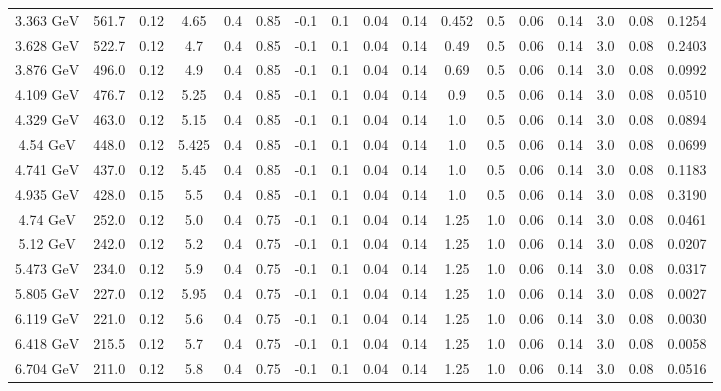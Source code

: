 \documentclass[11pt]{article}
\begin{document}
\begin{table}[htbp]
{\begin{tabular}{ccccccccccccccccc}
				3.363 ${\textrm{GeV}}$ & 561.7 & 0.12 & 4.65 & 0.4 & 0.85 & -0.1 & 0.1 & 0.04 & 0.14 & 0.452 & 0.5 & 0.06 & 0.14 & 3.0 & 0.08 & 0.1254 \\
				3.628 ${\textrm{GeV}}$ & 522.7 & 0.12 & 4.7 & 0.4 & 0.85 & -0.1 & 0.1 & 0.04 & 0.14 & 0.49 & 0.5 & 0.06 & 0.14 & 3.0 & 0.08 & 0.2403 \\
				3.876 ${\textrm{GeV}}$ & 496.0 & 0.12 & 4.9 & 0.4 & 0.85 & -0.1 & 0.1 & 0.04 & 0.14 & 0.69 & 0.5 & 0.06 & 0.14 & 3.0 & 0.08 & 0.0992 \\
				4.109 ${\textrm{GeV}}$ & 476.7 & 0.12 & 5.25 & 0.4 & 0.85 & -0.1 & 0.1 & 0.04 & 0.14 & 0.9 & 0.5 & 0.06 & 0.14 & 3.0 & 0.08 & 0.0510 \\
				4.329 ${\textrm{GeV}}$ & 463.0 & 0.12 & 5.15 & 0.4 & 0.85 & -0.1 & 0.1 & 0.04 & 0.14 & 1.0 & 0.5 & 0.06 & 0.14 & 3.0 & 0.08 & 0.0894 \\
				4.54 ${\textrm{GeV}}$ & 448.0 & 0.12 & 5.425 & 0.4 & 0.85 & -0.1 & 0.1 & 0.04 & 0.14 & 1.0 & 0.5 & 0.06 & 0.14 & 3.0 & 0.08 & 0.0699 \\
				4.741 ${\textrm{GeV}}$ & 437.0 & 0.12 & 5.45 & 0.4 & 0.85 & -0.1 & 0.1 & 0.04 & 0.14 & 1.0 & 0.5 & 0.06 & 0.14 & 3.0 & 0.08 & 0.1183 \\
				4.935 ${\textrm{GeV}}$ & 428.0 & 0.15 & 5.5 & 0.4 & 0.85 & -0.1 & 0.1 & 0.04 & 0.14 & 1.0 & 0.5 & 0.06 & 0.14 & 3.0 & 0.08 & 0.3190 \\
				\midrule
				4.74 ${\textrm{GeV}}$ & 252.0 & 0.12 & 5.0 & 0.4 & 0.75 & -0.1 & 0.1 & 0.04 & 0.14 & 1.25 & 1.0 & 0.06 & 0.14 & 3.0 & 0.08 & 0.0461 \\
				5.12 ${\textrm{GeV}}$ & 242.0 & 0.12 & 5.2 & 0.4 & 0.75 & -0.1 & 0.1 & 0.04 & 0.14 & 1.25 & 1.0 & 0.06 & 0.14 & 3.0 & 0.08 & 0.0207 \\
				5.473 ${\textrm{GeV}}$ & 234.0 & 0.12 & 5.9 & 0.4 & 0.75 & -0.1 & 0.1 & 0.04 & 0.14 & 1.25 & 1.0 & 0.06 & 0.14 & 3.0 & 0.08 & 0.0317 \\
				5.805 ${\textrm{GeV}}$ & 227.0 & 0.12 & 5.95 & 0.4 & 0.75 & -0.1 & 0.1 & 0.04 & 0.14 & 1.25 & 1.0 & 0.06 & 0.14 & 3.0 & 0.08 & 0.0027 \\
				6.119 ${\textrm{GeV}}$ & 221.0 & 0.12 & 5.6 & 0.4 & 0.75 & -0.1 & 0.1 & 0.04 & 0.14 & 1.25 & 1.0 & 0.06 & 0.14 & 3.0 & 0.08 & 0.0030 \\
				6.418 ${\textrm{GeV}}$ & 215.5 & 0.12 & 5.7 & 0.4 & 0.75 & -0.1 & 0.1 & 0.04 & 0.14 & 1.25 & 1.0 & 0.06 & 0.14 & 3.0 & 0.08 & 0.0058 \\
				6.704 ${\textrm{GeV}}$ & 211.0 & 0.12 & 5.8 & 0.4 & 0.75 & -0.1 & 0.1 & 0.04 & 0.14 & 1.25 & 1.0 & 0.06 & 0.14 & 3.0 & 0.08 & 0.0516 \\

\end{tabular}}
\end{table}
\end{document}
